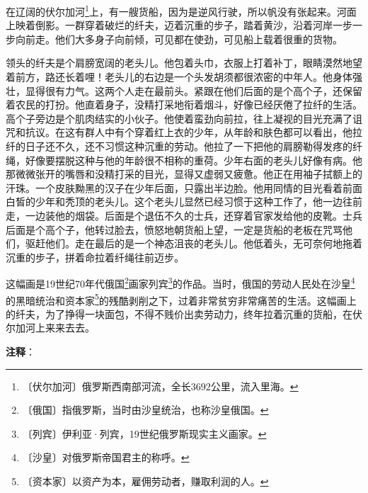 \documentclass[12pt,UTF-8,openany]{ctexbook}
\begin{document}
\begin{large}
    
    在辽阔的伏尔加河\footnote{〔伏尔加河〕俄罗斯西南部河流，全长3692公里，流入里海。}上，有一艘货船，因为是逆风行驶，所以帆没有张起来。河面上映着倒影。一群穿着破烂的纤夫，迈着沉重的步子，踏着黄沙，沿着河岸一步一步向前走。他们大多身子向前倾，可见都在使劲，可见船上载着很重的货物。
    
    领头的纤夫是个肩膀宽阔的老头儿。他包着头巾，衣服上打着补丁，眼睛漠然地望着前方，路还长着哩！老头儿的右边是一个头发胡须都很浓密的中年人。他身体强壮，显得很有力气。这两个人走在最前头。紧跟在他们后面的是个高个子，还保留着农民的打扮。他直着身子，没精打采地衔着烟斗，好像已经厌倦了拉纤的生活。高个子旁边是个肌肉结实的小伙子。他使着蛮劲向前拉，往上凝视的目光充满了诅咒和抗议。在这有群人中有个穿着红上衣的少年，从年龄和肤色都可以看出，他拉纤的日子还不久，还不习惯这种沉重的劳动。他拉了一下把他的肩膀勒得发疼的纤绳，好像要摆脱这种与他的年龄很不相称的重荷。少年右面的老头儿好像有病。他那微微张开的嘴唇和没精打采的目光，显得又虚弱又疲惫。他正在用袖子拭额上的汗珠。一个皮肤黝黑的汉子在少年后面，只露出半边脸。他用同情的目光看着前面白皙的少年和秃顶的老头儿。这个老头儿显然已经习惯于这种工作了，他一边往前走，一边装他的烟袋。后面是个退伍不久的士兵，还穿着官家发给他的皮靴。士兵后面是个高个子，他转过脸去，愤怒地朝货船上望，一定是货船的老板在咒骂他们，驱赶他们。走在最后的是一个神态沮丧的老头儿。他低着头，无可奈何地拖着沉重的步子，拼着命拉着纤绳往前迈步。
    
    这幅画是19世纪70年代俄国\footnote{〔俄国〕指俄罗斯，当时由沙皇统治，也称沙皇俄国。}画家列宾\footnote{〔列宾〕伊利亚·列宾，19世纪俄罗斯现实主义画家。}的作品。当时，俄国的劳动人民处在沙皇\footnote{〔沙皇〕对俄罗斯帝国君主的称呼。}的黑暗统治和资本家\footnote{〔资本家〕以资产为本，雇佣劳动者，赚取利润的人。}的残酷剥削之下，过着非常贫穷非常痛苦的生活。这幅画上的纤夫，为了挣得一块面包，不得不贱价出卖劳动力，终年拉着沉重的货船，在伏尔加河上来来去去。
    
\end{large}


\newpage

\textbf{注释}：

\vspace{-1em}
\end{document}
